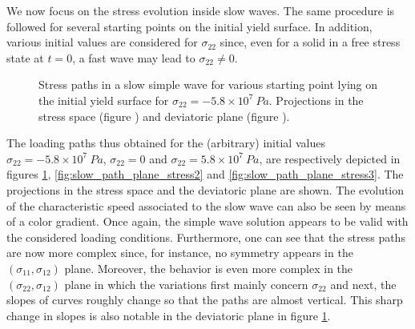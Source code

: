 We now focus on the stress evolution inside slow waves.
The same procedure is followed for several starting points on the initial yield surface.
In addition, various initial values are considered for $\sigma_{22}$ since, even for a solid in a free stress state at $t=0$, a fast wave may lead to $\sigma_{22}\neq 0$.
\begin{figure}[h!]
  \centering
  \caption{Stress paths in a slow simple wave for various starting point lying on the initial yield surface for $\sigma_{22}=-5.8\times 10^7 \: Pa$. Projections in the stress space (figure )  and deviatoric plane (figure ).}
  \label{fig:slow_path_plane_stress1}
\end{figure}
The loading paths thus obtained for the (arbitrary) initial values $\sigma_{22}=-5.8\times 10^7 \: Pa$, $\sigma_{22}=0$ and $\sigma_{22}=5.8\times 10^7 \: Pa$, are respectively depicted in figures \ref{fig:slow_path_plane_stress1}, \ref{fig:slow_path_plane_stress2} and \ref{fig:slow_path_plane_stress3}.
The projections in the stress space and the deviatoric plane are shown.
The evolution of the characteristic speed associated to the slow wave can also be seen by means of a color gradient.
Once again, the simple wave solution appears to be valid with the considered loading conditions.
Furthermore, one can see that the stress paths are now more complex since, for instance, no symmetry appears in the $(\sigma_{11},\sigma_{12})$ plane.
Moreover, the behavior is even more complex in the $(\sigma_{22},\sigma_{12})$ plane in which the variations first mainly concern $\sigma_{22}$ and next, the slopes of curves roughly change so that the paths are almost vertical.
This sharp change in slopes is also notable in the deviatoric plane in figure \ref{fig:slow_path_plane_stress1}.

